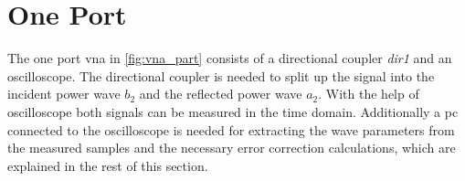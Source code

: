 \documentclass[12pt,a4paper,parskip=full,abstract=true,BCOR=10mm,twoside,open=right]{scrreprt}
\def\device#1{\textit{#1}}
\begin{document}

\section{One Port }
\label{sec:vna}

The one port \gls{vna} in \cref{fig:vna_part} consists of a directional coupler
\device{dir1} and an oscilloscope. The directional coupler is needed to split up
the signal into the incident power wave $b_{2}$ and the reflected power
wave $a_{2}$. With the help of oscilloscope both signals can be measured in the
time domain. Additionally a \gls{pc} connected to the oscilloscope is needed
for extracting the wave parameters from the measured samples and the necessary
error correction calculations, which are explained in the rest of this section.
\end{document}
